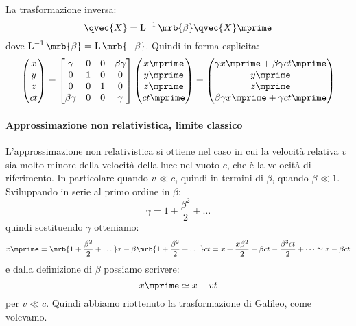 La trasformazione inversa:
\begin{equation}
  \qvec{X} = \operatorname{L}^{-1}\mrb{\beta} \qvec{X}\mprime
\end{equation}
dove $\operatorname{L}^{-1}\mrb{\beta} = \operatorname{L}\mrb{-\beta}$.
Quindi in forma esplicita:
\begin{equation}
  \begin{pmatrix}
    x
    \\
    y
    \\
    z
    \\
    ct
  \end{pmatrix} = 
  \begin{bmatrix}
    \gamma & 0 & 0 & \beta \gamma
    \\
    0 & 1 & 0 & 0
    \\
    0 & 0 & 1 & 0
    \\
    \beta \gamma & 0 & 0 & \gamma
  \end{bmatrix}
  \begin{pmatrix}
    x \mprime
    \\
    y \mprime
    \\
    z \mprime
    \\
    ct \mprime
  \end{pmatrix} = 
  \begin{pmatrix}
    \gamma x \mprime + \beta \gamma c t \mprime
    \\
    y \mprime
    \\
    z \mprime
    \\
    \beta \gamma x \mprime + \gamma ct \mprime
  \end{pmatrix}
\end{equation}

\paragraph{Approssimazione non relativistica, limite classico}
L'approssimazione non relativistica si ottiene nel caso in cui la velocità
relativa $v$ sia molto minore della velocità della luce nel vuoto $c$, che è la
velocità di riferimento. In particolare quando $v \ll c$, quindi in termini di
$\beta$, quando $\beta \ll 1$. Sviluppando in serie al primo ordine in $\beta$:
\begin{equation}
  \gamma = 1 + \frac{\beta^2}{2} + \dots
\end{equation}
quindi sostituendo $\gamma$ otteniamo:
\begin{equation}
  x \mprime = \mrb{1 + \frac{\beta^2}{2} + \dots} x - \beta \mrb{1 +
  \frac{\beta^2}{2} + \dots} ct
  = x + \frac{x \beta^2}{2} - \beta ct - \frac{\beta^3 ct}{2} + \dots
  \simeq x - \beta ct
\end{equation}
e dalla definizione di $\beta$ possiamo scrivere:
\begin{equation}
  x \mprime \simeq x - vt
\end{equation}
per $v \ll c$. Quindi abbiamo riottenuto la trasformazione di Galileo, come
volevamo.

